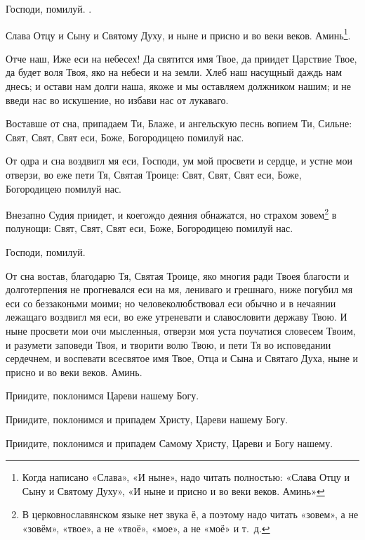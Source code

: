 \begin{mymulticols}
Господи, помилуй. .

Слава Отцу и Сыну и Святому Духу, и ныне и присно и во веки веков. Аминь\footnote{Когда написано «Слава», «И ныне», надо читать полностью: «Слава Отцу и Сыну и Святому Духу», «И ныне и присно и во веки веков. Аминь»}.


Отче наш, Иже еси на небесех! Да святится имя Твое, да приидет Царствие Твое, да будет воля Твоя, яко на небеси и на земли. Хлеб наш насущный даждь нам днесь; и остави нам долги наша, якоже и мы оставляем должником нашим; и не введи нас во искушение, но избави нас от лукаваго.


Воставше от сна, припадаем Ти, Блаже, и ангельскую песнь вопием Ти, Сильне: Свят, Свят, Свят еси, Боже, Богородицею помилуй нас.

\slavan

 От одра и сна воздвигл мя еси, Господи, ум мой просвети и сердце, и устне мои отверзи, во еже пети Тя, Святая Троице: Свят, Свят, Свят еси, Боже, Богородицею помилуй нас.

\inynen

 Внезапно Судия приидет, и коегождо деяния обнажатся, но страхом зовем\footnote{В церковнославянском языке нет звука ё, а поэтому надо читать «зовем», а не «зовём», «твое», а не «твоё», «мое», а не «моё» и т.~д.} в полунощи: Свят, Свят, Свят еси, Боже, Богородицею помилуй нас.

Господи, помилуй. 


От сна востав, благодарю Тя, Святая Троице, яко многия ради Твоея благости и долготерпения не прогневался еси на мя, лениваго и грешнаго, ниже погубил мя еси со беззаконьми моими; но человеколюбствовал еси обычно и в нечаянии лежащаго воздвигл мя еси, во еже утреневати и славословити державу Твою. И ныне просвети мои очи мысленныя, отверзи моя уста поучатися словесем Твоим, и разумети заповеди Твоя, и творити волю Твою, и пети Тя во исповедании сердечнем, и воспевати всесвятое имя Твое, Отца и Сына и Святаго Духа, ныне и присно и во веки веков. Аминь.

Приидите, поклонимся Цареви нашему Богу. 

Приидите, поклонимся и припадем Христу, Цареви нашему Богу. 

Приидите, поклонимся и припадем Самому Христу, Цареви и Богу нашему. 


\end{mymulticols}
